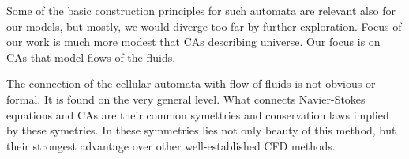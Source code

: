 Some of the basic construction principles for such automata are relevant also for our models, but mostly, we would diverge too far by further exploration.
Focus of our work is much more modest that CAs describing universe.
Our focus is on CAs that model flows of the fluids.

The connection of the cellular automata with flow of fluids is not obvious or formal.
It is found on the very general level.
What connects Navier-Stokes equations and CAs are their common symettries and conservation laws implied by these symetries.
In these symmetries lies not only beauty of this method, but their strongest advantage over other well-established CFD methods.